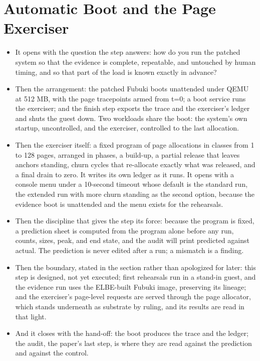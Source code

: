 \documentclass[11pt]{article}
\begin{document}
\section{Automatic Boot and the Page Exerciser}

\begin{itemize}
\item It opens with the question the step answers: how do you run the patched system so that the evidence is complete, repeatable, and untouched by human timing, and so that part of the load is known exactly in advance?
\item Then the arrangement: the patched Fubuki boots unattended under QEMU at 512 MB, with the page tracepoints armed from t=0; a boot service runs the exerciser; and the finish step exports the trace and the exerciser's ledger and shuts the guest down. Two workloads share the boot: the system's own startup, uncontrolled, and the exerciser, controlled to the last allocation.
\item Then the exerciser itself: a fixed program of page allocations in classes from 1 to 128 pages, arranged in phases, a build-up, a partial release that leaves anchors standing, churn cycles that re-allocate exactly what was released, and a final drain to zero. It writes its own ledger as it runs. It opens with a console menu under a 10-second timeout whose default is the standard run, the extended run with more churn standing as the second option, because the evidence boot is unattended and the menu exists for the rehearsals.
\item Then the discipline that gives the step its force: because the program is fixed, a prediction sheet is computed from the program alone before any run, counts, sizes, peak, and end state, and the audit will print predicted against actual. The prediction is never edited after a run; a mismatch is a finding.
\item Then the boundary, stated in the section rather than apologized for later: this step is designed, not yet executed; first rehearsals run in a stand-in guest, and the evidence run uses the ELBE-built Fubuki image, preserving its lineage; and the exerciser's page-level requests are served through the page allocator, which stands underneath as substrate by ruling, and its results are read in that light.
\item And it closes with the hand-off: the boot produces the trace and the ledger; the audit, the paper's last step, is where they are read against the prediction and against the control.
\end{itemize}
\end{document}
